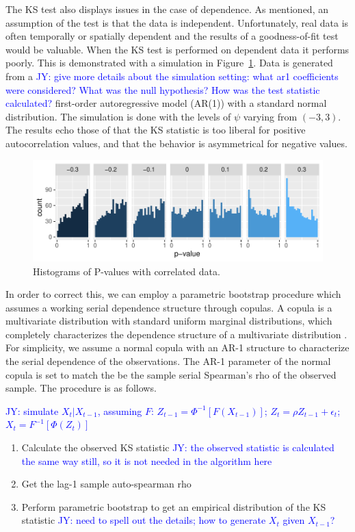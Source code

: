 \documentclass[12pt, letterpaper, titlepage]{article}
\newcommand{\jy}[1]{\textcolor{blue}{JY: #1}}
\begin{document}
The KS test also displays issues in the case of dependence. As mentioned, an assumption of the 
test is that the data is independent. Unfortunately, real data is often temporally
or spatially dependent and the results of a goodness-of-fit test would be valuable. 
When the KS test is performed on dependent data it performs poorly. This is demonstrated
with a simulation in Figure~\ref{fig:hist_correlation}. Data is generated from a
\jy{give more details about the simulation setting: what ar1 coefficients were
  considered? What was the null hypothesis? How was the test statistic calculated?}
first-order autoregressive model (AR(1)) with a standard normal distribution. The simulation
is done with the levels of $\psi$ varying from $(-3,3)$. The results echo those of \citet{Durilleul}
that the KS statistic is too liberal for positive autocorrelation values, and 
that the behavior is asymmetrical for negative values.

\begin{figure}[tbp]
  \centering
  \includegraphics{hist_correlation}
  \caption{Histograms of P-values with correlated data.}
  \label{fig:hist_correlation}
\end{figure}

In order to correct this, we can employ a parametric bootstrap procedure which
assumes a working serial dependence structure through copulas. A copula is a
multivariate distribution with standard uniform marginal distributions, which
completely characterizes the dependence structure of a multivariate
distribution \cite{copula, book}. For simplicity, we assume a normal copula with
an AR-1 structure to characterize the serial dependence of the observations. The
AR-1 parameter of the normal copula is set to match the be the sample serial
Spearman's rho of the observed sample. The procedure is as follows.


\jy{simulate $X_t | X_{t-1}$, assuming $F$:
  $Z_{t-1} = \Phi^{-1}[ F(X_{t-1})]$;
  $Z_{t} = \rho Z_{t -1} +  \epsilon_t$;
  $X_t = F^{-1} [ \Phi(Z_t) ]$
  }
  
\begin{enumerate}
  \item Calculate the observed KS statistic \jy{the observed statistic is
      calculated the same way still, so it is not needed in the algorithm here}
  \item Get the lag-1 sample auto-spearman rho
  \item Perform parametric bootstrap to get an empirical distribution of the KS
    statistic
    \jy{need to spell out the details; how to generate $X_t$ given $X_{t-1}$?}
\end{enumerate}
\end{document}

